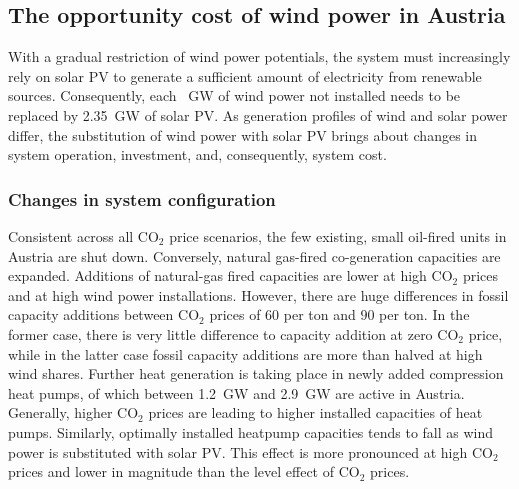\documentclass[review, 3p, times]{elsarticle} %
\newcommand{\COO}{\ensuremath{\mathrm{CO_2}} }
\begin{document}
    \subsection{The opportunity cost of wind power in Austria}\label{subsec:opportunity-cost-wind}
    With a gradual restriction of wind power potentials, the system must increasingly rely on solar PV to generate a
    sufficient amount of electricity from renewable sources.
    Consequently, each \SI{}{\giga\watt} of wind power not installed needs to be replaced by \SI{2.35}{\giga\watt} of
    solar PV\@.
    As generation profiles of wind and solar power differ, the substitution of wind power with solar PV brings about
    changes in system operation, investment, and, consequently, system cost.

    \subsubsection{Changes in system configuration}
    Consistent across all \COO price scenarios, the few existing, small oil-fired units in Austria are shut down.
    Conversely, natural gas-fired co-generation capacities are expanded.
    Additions of natural-gas fired capacities are lower at high \COO prices and at high wind power installations.
    However, there are huge differences in fossil capacity additions between \COO prices of $60$ \EUR per ton and $90$
    \EUR per ton.
    In the former case, there is very little difference to capacity addition at zero \COO price, while in the latter case
    fossil capacity additions are more than halved at high wind shares.
    Further heat generation is taking place in newly added compression heat pumps, of which between \SI{1.2}{\giga\watt}
    and \SI{2.9}{\giga\watt} are active in Austria.
    Generally, higher \COO prices are leading to higher installed capacities of heat pumps.
    Similarly, optimally installed heatpump capacities tends to fall as wind power is substituted with solar PV.
    This effect is more pronounced at high \COO prices and lower in magnitude than the level effect of \COO prices.
\end{document}
